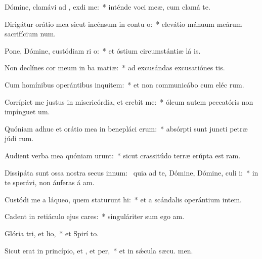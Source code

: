 \item Dómine, clamávi ad , exdi me:~* inténde voci meæ, cum clamá  te.
\item Dirigátur orátio mea sicut incénsum in contu o:~* elevátio mánuum meárum sacrifícium num.
\item Pone, Dómine, custódiam ri o:~* et óstium circumstántiæ lá is.
\item Non declínes cor meum in ba matiæ:~* ad excusándas excusatiónes  tis.
\item Cum homínibus operántibus inquitem:~* et non communicábo cum eléc rum.
\item Corrípiet me justus in misericórdia, et crebit me:~* óleum autem peccatóris non impínguet  um.
\item Quóniam adhuc et orátio mea in benepláci erum:~* absórpti sunt juncti petræ júdi rum.
\item Audient verba mea quóniam urunt:~* sicut crassitúdo terræ erúpta est  ram.
\item Dissipáta sunt ossa nostra secus innum:~\pscross{} quia ad te, Dómine, Dómine, culi i:~* in te sperávi, non áuferas á am.
\item Custódi me a láqueo, quem staturunt hi:~* et a scándalis operántium intem.
\item Cadent in retiáculo ejus cares:~* singuláriter sum ego  am.
\item Glória tri, et lio,~* et Spirí to.
\item Sicut erat in princípio, et , et per,~* et in sǽcula sæcu. men.
